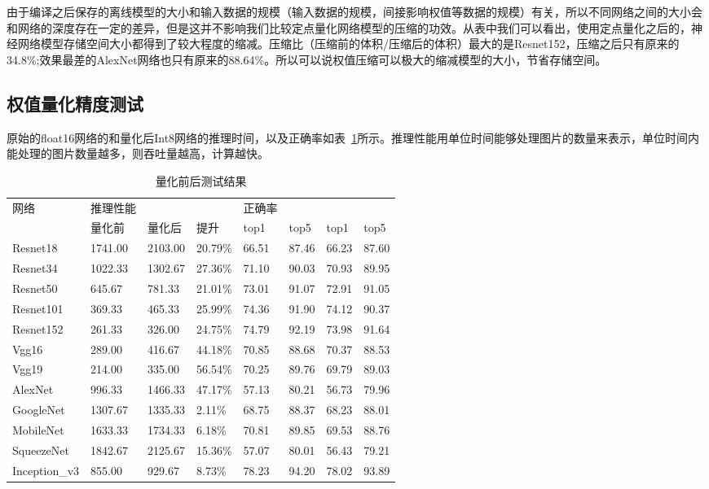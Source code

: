 由于编译之后保存的离线模型的大小和输入数据的规模（输入数据的规模，间接影响权值等数据的规模）有关，所以不同网络之间的大小会和网络的深度存在一定的差异，但是这并不影响我们比较定点量化网络模型的压缩的功效。从表中我们可以看出，使用定点量化之后的，神经网络模型存储空间大小都得到了较大程度的缩减。压缩比（压缩前的体积/压缩后的体积）最大的是Resnet152，压缩之后只有原来的34.8\%;效果最差的AlexNet网络也只有原来的88.64\%。所以可以说权值压缩可以极大的缩减模型的大小，节省存储空间。

\subsection {权值量化精度测试}

原始的float16网络的和量化后Int8网络的推理时间，以及正确率如表~\ref{tab:quant-result-data}所示。推理性能用单位时间能够处理图片的数量来表示，单位时间内能处理的图片数量越多，则吞吐量越高，计算越快。

\begin{table}[htb]
  \centering\small
  \caption{量化前后测试结果}
  \label{tab:quant-result-data}
  \begin{tabular}{llllllll}
    \toprule
    网络      & 推理性能& &       &正确率 & & &              \\
              &量化前 &量化后 &提升  &top1 & top5 &top1 &top5  \\ 
    \midrule
    Resnet18  & 1741.00 & 2103.00 & 20.79\%  & 66.51 & 87.46 & 66.23 & 87.60  \\
    Resnet34  & 1022.33 & 1302.67 & 27.36\%  & 71.10 & 90.03 & 70.93 & 89.95  \\
    Resnet50  & 645.67  & 781.33  & 21.01\%  & 73.01 & 91.07 & 72.91 & 91.05  \\
    Resnet101 & 369.33  & 465.33  & 25.99\%  & 74.36 & 91.90 & 74.12 & 90.37  \\
    Resnet152 & 261.33  & 326.00  & 24.75\%  & 74.79 & 92.19 & 73.98 & 91.64   \\
    Vgg16     & 289.00  & 416.67  & 44.18\%  & 70.85 & 88.68 & 70.37 & 88.53  \\
    Vgg19     & 214.00  & 335.00  & 56.54\%  & 70.25 & 89.76 & 69.79 & 89.03  \\
    AlexNet   & 996.33  & 1466.33 & 47.17\%  & 57.13 & 80.21 & 56.73 & 79.96  \\
    GoogleNet & 1307.67 & 1335.33 & 2.11\%   & 68.75 & 88.37 & 68.23 & 88.01  \\
    MobileNet & 1633.33 & 1734.33 & 6.18\%   & 70.81 & 89.85 & 69.53 & 88.76  \\
    SqueezeNet & 1842.67 & 2125.67 & 15.36\% & 57.07 & 80.01 & 56.43 & 79.21  \\
    Inception\_v3 & 855.00 & 929.67  & 8.73\% & 78.23 & 94.20 & 78.02 & 93.89  \\
    \bottomrule
  \end{tabular}
\end{table}


